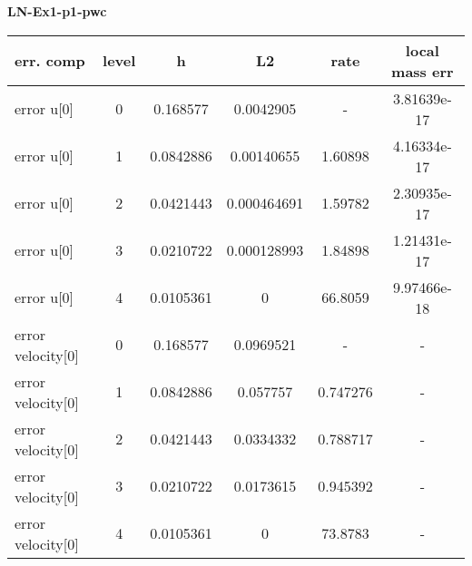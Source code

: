 \documentclass{amsart}
\begin{document}
\begin{center}   
{\bf LN-Ex1-p1-pwc }\end{center}  
\tableofcontents

\begin{table}[h!]
\begin{tabular}{|l|c|c|c|c|c|}
\hline
err. comp & level & h  & L2 & rate  & local mass err \\ 
\hline
error u[0] & 0 & 0.168577  & 0.0042905 & -   &  3.81639e-17 \\ 
error u[0] & 1 & 0.0842886 & 0.00140655 & 1.60898   &  4.16334e-17 \\ 
error u[0] & 2 & 0.0421443 & 0.000464691 & 1.59782   &  2.30935e-17 \\ 
error u[0] & 3 & 0.0210722 & 0.000128993 & 1.84898   &  1.21431e-17 \\ 
error u[0] & 4 & 0.0105361 & 0 & 66.8059   &  9.97466e-18 \\ 
error velocity[0] & 0 & 0.168577  & 0.0969521 & -   & - \\ 
error velocity[0] & 1 & 0.0842886 & 0.057757  & 0.747276   & - \\ 
error velocity[0] & 2 & 0.0421443 & 0.0334332 & 0.788717   & - \\ 
error velocity[0] & 3 & 0.0210722 & 0.0173615 & 0.945392   & - \\ 
error velocity[0] & 4 & 0.0105361 & 0 & 73.8783   & - \\ 

\hline
\end{tabular}
\end{table}
\end{document}
